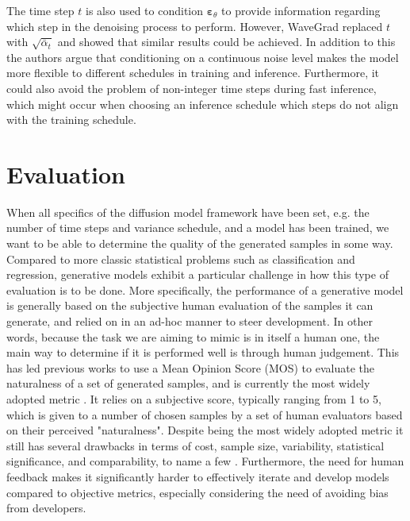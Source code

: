 \documentclass{report}
\begin{document}
The time step $t$ is also used to condition $\bm{\varepsilon}_{\theta}$ to provide information regarding which step in the denoising process to perform. However, WaveGrad \cite{chen2020wavegrad} replaced $t$ with $\sqrt{\bar{\alpha}_t}$ and showed that similar results could be achieved. In addition to this the authors argue that conditioning on a continuous noise level makes the model more flexible to different schedules in training and inference. Furthermore, it could also avoid the problem of non-integer time steps during fast inference, which might occur when choosing an inference schedule which steps do not align with the training schedule.

\section{Evaluation} \label{sec:eval}

When all specifics of the diffusion model framework have been set, e.g. the number of time steps and variance schedule, and a model has been trained, we want to be able to determine the quality of the generated samples in some way. Compared to more classic statistical problems such as classification and regression, generative models exhibit a particular challenge in how this type of evaluation is to be done. More specifically, the performance of a generative model is generally based on the subjective human evaluation of the samples it can generate, and relied on in an ad-hoc manner to steer development. In other words, because the task we are aiming to mimic is in itself a human one, the main way to determine if it is performed well is through human judgement. This has led previous works to use a Mean Opinion Score (MOS) to evaluate the naturalness of a set of generated samples, and is currently the most widely adopted metric \cite{oord2016wavenet, kong2020diffwave, wang2017tacotron}. It relies on a subjective score, typically ranging from 1 to 5, which is given to a number of chosen samples by a set of human evaluators based on their perceived "naturalness". Despite being the most widely adopted metric it still has several drawbacks in terms of cost, sample size, variability, statistical significance, and comparability, to name a few \cite{streijl2016mean}. Furthermore, the need for human feedback makes it significantly harder to effectively iterate and develop models compared to objective metrics, especially considering the need of avoiding bias from developers.
\end{document}
